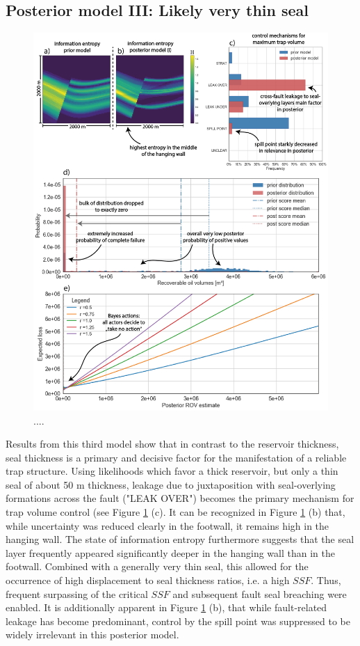 		\subsection{Posterior model III: Likely very thin seal}%
		\begin{figure}[p!]
			\centering
			\includegraphics[width=1\textwidth]{Figures/ML2}
			\caption{....}\label{fig:ML2}
		\end{figure}
		Results from this third model show that in contrast to the reservoir thickness, seal thickness is a primary and decisive factor for the manifestation of a reliable trap structure. Using likelihoods which favor a thick reservoir, but only a thin seal of about 50 m thickness, leakage due to juxtaposition with seal-overlying formations across the fault ("LEAK OVER") becomes the primary mechanism for trap volume control (see Figure \ref{fig:ML2} (c). It can be recognized in Figure \ref{fig:ML2} (b) that, while uncertainty was reduced clearly in the footwall, it remains high in the hanging wall. The state of information entropy furthermore suggests that the seal layer frequently appeared significantly deeper in the hanging wall than in the footwall. Combined with a generally very thin seal, this allowed for the occurrence of high displacement to seal thickness ratios, i.e. a high $SSF$. Thus, frequent surpassing of the critical $SSF$ and subsequent fault seal breaching were enabled. It is additionally apparent in Figure \ref{fig:ML2} (b), that while fault-related leakage has become predominant, control by the spill point was suppressed to be widely irrelevant in this posterior model.\\	%
